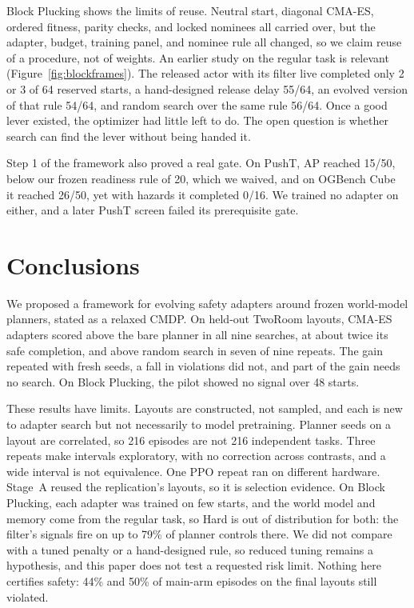 \documentclass[dvipsnames,format=sigconf]{acmart}
\newcommand{\cmaes}{CMA-ES}
\begin{document}
Block Plucking shows the limits of reuse. Neutral start, diagonal \cmaes{}, ordered fitness, parity checks, and
locked nominees all carried over, but the adapter, budget, training panel, and nominee rule all changed, so we
claim reuse of a procedure, not of weights. An earlier study on the regular task is relevant
(Figure~\ref{fig:blockframes}). The released actor with its filter live completed only 2 or 3 of 64 reserved
starts, a hand-designed release delay 55/64, an evolved version of that rule 54/64, and random search over the
same rule 56/64. %
Once a good lever existed, the optimizer had little left to do. The open question is whether search can find
the lever without being handed it.

Step 1 of the framework also proved a real gate. On PushT, AP reached 15/50, below our frozen readiness rule of
20, which we waived, and on OGBench Cube~\cite{park2025ogbench} it reached 26/50, yet with hazards it completed
0/16. We trained no adapter on either, and a later PushT screen failed its prerequisite gate.

\section{Conclusions}
\label{sec:conclusions}

We proposed a framework for evolving safety adapters around frozen world-model planners, stated as a relaxed
CMDP. On held-out TwoRoom layouts, \cmaes{} adapters scored above the bare planner in all nine searches, at about
twice its safe completion, and above random search in seven of nine repeats. The gain repeated with fresh seeds,
a fall in violations did not, and part of the gain needs no search. On Block Plucking, the pilot showed no signal
over 48 starts.

These results have limits. Layouts are constructed, not sampled, and each is new to adapter search but not
necessarily to model pretraining. Planner seeds on a layout are correlated, so 216 episodes are not 216 independent
tasks. Three repeats make intervals exploratory, with no correction across contrasts, and a wide interval is not
equivalence. One PPO repeat ran on different hardware. Stage~A reused the replication's layouts, so it is selection
evidence. On Block Plucking, each adapter was trained on few starts, and the world model and memory come from the
regular task, so Hard is out of distribution for both: the filter's signals fire on up to 79\% of planner controls
there. We did not compare with a tuned penalty or a hand-designed rule, so reduced tuning remains a hypothesis, and
this paper does not test a requested risk limit. Nothing here certifies safety: 44\% and 50\% of main-arm episodes on
the final layouts still violated.
\end{document}
